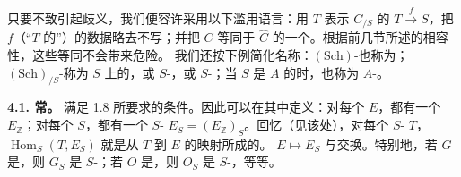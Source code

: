 只要不致引起歧义，我们便容许采用以下滥用语言：用 $T$ 表示 $C_{/S}$ 的 $T\xrightarrow f S$，把 $f$（“$T$ 的”）的数据略去不写；并把 $C$ 等同于 $\widehat C$ 的一个。根据前几节所述的相容性，这些等同不会带来危险。
我们还按下例简化名称：$(\mathrm{Sch})$-也称为；$(\mathrm{Sch})_{/S}$-称为 $S$ 上的，或 $S$-，或 $S$-；当 $S$ 是 $A$ 的时，也称为 $A$-。

\textbf{4.1. 常。} 满足 1.8 所要求的条件。因此可以在其中定义：对每个 $E$，都有一个 $E_{\mathbb Z}$；对每个 $S$，都有一个 $S$- $E_S=(E_{\mathbb Z})_S$。回忆（见该处），对每个 $S$- $T$，$\operatorname{Hom}_S(T,E_S)$ 就是从 $T$ 到 $E$ 的映射所成的。
 $E\mapsto E_S$ 与交换。特别地，若 $G$ 是，则 $G_S$ 是 $S$-；若 $O$ 是，则 $O_S$ 是 $S$-，等等。

